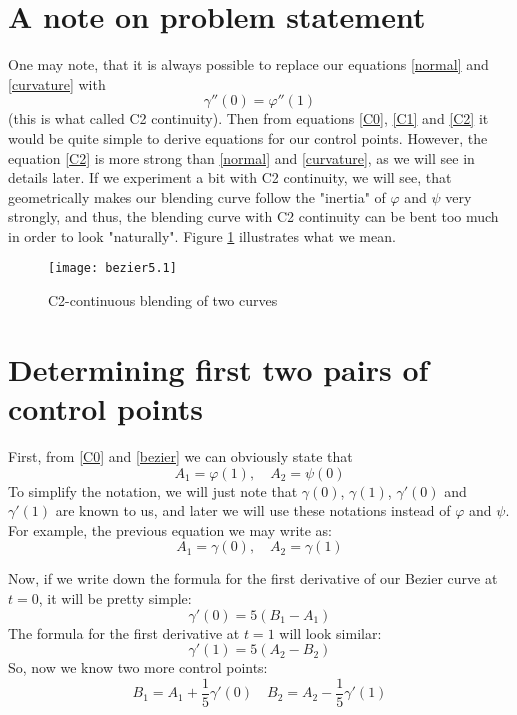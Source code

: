 \documentclass[12pt,a4paper]{article}
\begin{document}
\section{A note on problem statement}
One may note, that it is always possible to replace our equations \eqref{normal} and \eqref{curvature} with
\begin{equation}\label{C2}
\gamma''(0) = \varphi''(1)
\end{equation}
(this is what called C2 continuity).
Then from equations \eqref{C0}, \eqref{C1} and \eqref{C2} it would be quite simple to derive equations for our control points. However, the equation \eqref{C2} is more strong than \eqref{normal} and \eqref{curvature}, as we will see in details later. If we experiment a bit with C2 continuity, we will see, that geometrically makes our blending curve follow the "inertia" of $\varphi$ and $\psi$ very strongly, and thus, the blending curve with C2 continuity can be bent too much in order to look "naturally". Figure \ref{fig:C2} illustrates what we mean.

\begin{figure}[h]
\caption{C2-continuous blending of two curves}
\label{fig:C2}
\texttt{[image: bezier5.1]}
\centering
\end{figure}

\section{Determining first two pairs of control points}

First, from \eqref{C0} and \eqref{bezier} we can obviously state that
$$
A_1 = \varphi(1),\quad A_2 = \psi(0)
$$
To simplify the notation, we will just note that $\gamma(0)$, $\gamma(1)$, $\gamma'(0)$ and $\gamma'(1)$ are known to us, and later we will use these notations instead of $\varphi$ and $\psi$. For example, the previous equation we may write as:
\begin{equation}
A_1 = \gamma(0), \quad A_2 = \gamma(1)
\end{equation}

Now, if we write down the formula for the first derivative of our Bezier curve at $t = 0$, it will be pretty simple:
\begin{equation}
\gamma'(0) = 5(B_1 - A_1)
\end{equation}
The formula for the first derivative at $t = 1$ will look similar:
\begin{equation}
\gamma'(1) = 5(A_2 - B_2)
\end{equation}
So, now we know two more control points:
\begin{equation}
B_1 = A_1 + \frac{1}{5}\gamma'(0) \quad B_2 = A_2 - \frac{1}{5}\gamma'(1)
\end{equation}
\end{document}
